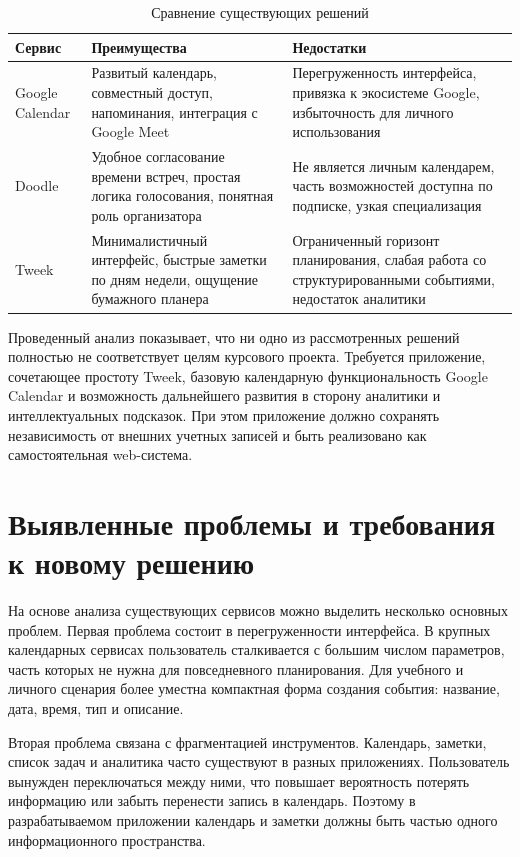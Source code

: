 \documentclass[14pt,a4paper]{extreport}
\begin{document}
\begin{table}[H]
\centering
\caption{Сравнение существующих решений}
\begin{tabular}{|p{}|p{}|p{}|}
\hline
\textbf{Сервис} & \textbf{Преимущества} & \textbf{Недостатки} \\
\hline
Google Calendar & Развитый календарь, совместный доступ, напоминания, интеграция с Google Meet & Перегруженность интерфейса, привязка к экосистеме Google, избыточность для личного использования \\
\hline
Doodle & Удобное согласование времени встреч, простая логика голосования, понятная роль организатора & Не является личным календарем, часть возможностей доступна по подписке, узкая специализация \\
\hline
Tweek & Минималистичный интерфейс, быстрые заметки по дням недели, ощущение бумажного планера & Ограниченный горизонт планирования, слабая работа со структурированными событиями, недостаток аналитики \\
\hline
\end{tabular}
\end{table}

Проведенный анализ показывает, что ни одно из рассмотренных решений полностью не соответствует целям курсового проекта. Требуется приложение, сочетающее простоту Tweek, базовую календарную функциональность Google Calendar и возможность дальнейшего развития в сторону аналитики и интеллектуальных подсказок. При этом приложение должно сохранять независимость от внешних учетных записей и быть реализовано как самостоятельная web-система.

\section{Выявленные проблемы и требования к новому решению}

На основе анализа существующих сервисов можно выделить несколько основных проблем. Первая проблема состоит в перегруженности интерфейса. В крупных календарных сервисах пользователь сталкивается с большим числом параметров, часть которых не нужна для повседневного планирования. Для учебного и личного сценария более уместна компактная форма создания события: название, дата, время, тип и описание.

Вторая проблема связана с фрагментацией инструментов. Календарь, заметки, список задач и аналитика часто существуют в разных приложениях. Пользователь вынужден переключаться между ними, что повышает вероятность потерять информацию или забыть перенести запись в календарь. Поэтому в разрабатываемом приложении календарь и заметки должны быть частью одного информационного пространства.
\end{document}
